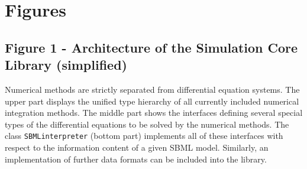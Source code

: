 \documentclass[10pt]{bmc_article}
\newenvironment{bmcformat}{\baselineskip20pt\sloppy\setboolean{publ}{false}}{\baselineskip20pt\sloppy}
\newcommand{\SBMLinterpreter}{\texttt{SBML\-interpreter}}
\begin{document}
\begin{bmcformat}

\newpage
{
   }     %





\section*{Figures}
  \subsection*{Figure 1 - Architecture of the Simulation Core Library
  (simplified)}
  
Numerical methods are strictly separated from differential equation systems. The
upper part displays the unified type hierarchy of all currently included numerical integration
methods. The middle part shows the interfaces defining several
special types of the differential equations to be solved by the numerical
methods.
The class \SBMLinterpreter{} (bottom part) implements all of these interfaces
with respect to the information content of a given SBML model. Similarly, an
implementation of further data formats can be included into the
library.


\end{bmcformat}
\end{document}

